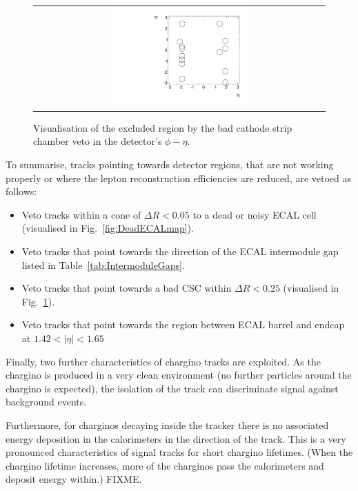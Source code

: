 \begin{figure}[!b]
  \centering 
  \begin{tabular}{c}
    \includegraphics[width=0.49\textwidth]{figures/analysis/AnalysisSelection/BadCSCMap2.pdf}
  \end{tabular}
  \caption{Visualisation of the excluded region by the bad cathode strip chamber veto in the detector's $\phi - \eta$.}
  \label{fig:BadCSCMap}
\end{figure}

To summarise, tracks pointing towards detector regions, that are not working properly or where the lepton reconstruction efficiencies are reduced, are vetoed as follows:
\begin{itemize}
\renewcommand{\labelitemi}{\footnotesize{\ding{118}}}
\item Veto tracks within a cone of $\Delta R<0.05$ to a dead or noisy ECAL cell (visualised in Fig.~\ref{fig:DeadECALmap}).
\item Veto tracks that point towards the direction of the ECAL intermodule gap listed in Table~\ref{tab:IntermoduleGaps}.
\item Veto tracks that point towards a bad CSC within $\Delta R<0.25$ (visualised in Fig.~\ref{fig:BadCSCMap}).
\item Veto tracks that point towards the region between ECAL barrel and endcap at $1.42<|\eta|<1.65$
\end{itemize}



Finally, two further characteristics of chargino tracks are exploited.
As the chargino is produced in a very clean environment (no further particles around the chargino is expected), the isolation of the track can discriminate signal against background events.

Furthermore, for charginos decaying inside the tracker there is no associated energy deposition in the calorimeters in the direction of the track.
This is a very pronounced characteristics of signal tracks for short chargino lifetimes. (When the chargino lifetime increases, more of the charginos pass the calorimeters and deposit energy within.) FIXME.

